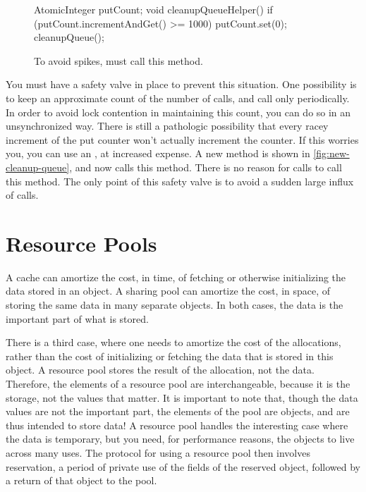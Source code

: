 \begin{wrapfigure}{r}{0.4\textwidth}
\centering
\begin{framedlisting}
AtomicInteger putCount;
void cleanupQueueHelper() {
  if (putCount.incrementAndGet() >= 1000) {
    putCount.set(0);
    cleanupQueue();
  }
}
\end{framedlisting}
\caption{To avoid spikes,  must call this method.}
\label{fig:new-cleanup-queue}
\end{wrapfigure}
You must have a safety valve in place to prevent this situation. One possibility
is to keep an approximate count of the number of  calls, and call
 only periodically. In order to avoid lock contention in
maintaining this count, you can do so in an unsynchronized way. There is still a
pathologic possibility that every racey increment of the put counter won't
actually increment the counter. If this worries you, you can use an
, at increased expense. A new 
method is shown in \autoref{fig:new-cleanup-queue}, and  now calls
this method. There is no reason for  calls to call this method. The
only point of this safety valve is to avoid a sudden large influx of  calls.



\section{Resource Pools}
\label{sec:resource-pools}

A cache can amortize the cost, in time, of fetching or otherwise initializing the
data stored in an object. A sharing pool can amortize the cost, in space, of
storing the same data in many separate objects. In both cases, the data is the
important part of what is stored.

 There is a third case,
where one needs to amortize the cost of the allocations, rather than the cost of
initializing or fetching the data that is stored in this object. A resource pool
stores the result of the allocation, not the data. Therefore, the elements of a
resource pool are interchangeable, because it is the storage, not the values that
matter. It is important to note that, though the data values are not the
important part, the elements of the pool are objects, and are thus intended to
store data! A resource pool handles the interesting case where the data is
temporary, but you need, for performance reasons, the objects to live across many
uses. The protocol for using a resource pool then involves reservation, a period
of private use of the fields of the reserved object, followed by a return of that
object to the pool.

